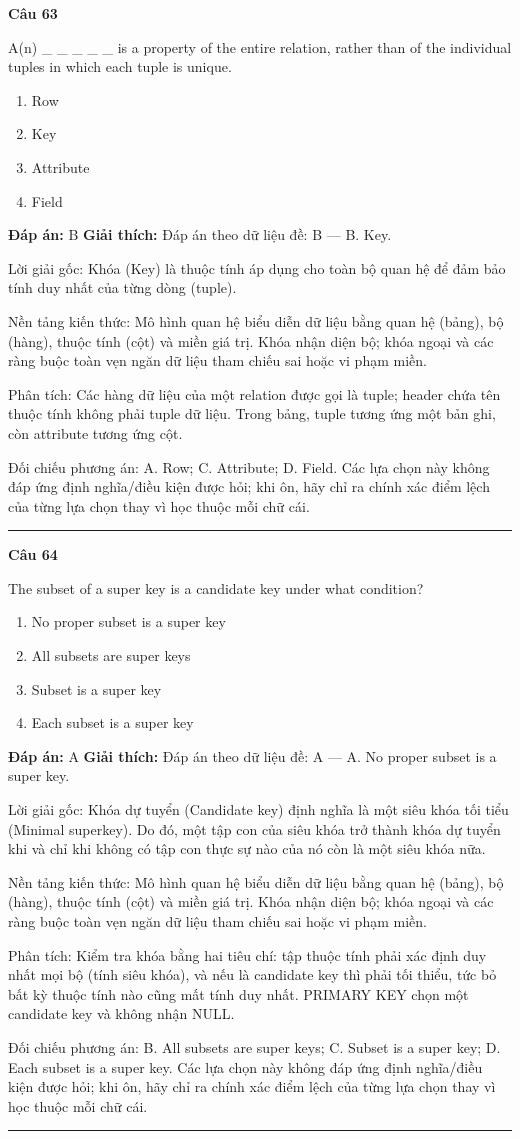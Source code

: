 \documentclass[11pt,a4paper]{article}
\newenvironment{question}[1]{%
  \par\vspace{1em}\noindent\textbf{\large Câu #1}\par\vspace{0.4em}
}{%
  \par\vspace{1em}\hrule\vspace{0.6em}
}
\newenvironment{choices}{%
  \begin{enumerate}[label=\textbf{\Alph*.},leftmargin=2.2em,itemsep=2pt,topsep=3pt]
}{%
  \end{enumerate}
}
\newcommand{\choice}{\item}
\begin{document}
\begin{question}{63}
A(n) _ _ _ _ _ is a property of the entire relation, rather than of the individual tuples in which each tuple is unique.
\begin{choices}
\choice Row
\choice Key
\choice Attribute
\choice Field
\end{choices}
\textbf{Đáp án:} B
\textbf{Giải thích:} Đáp án theo dữ liệu đề: B — B. Key.

Lời giải gốc: Khóa (Key) là thuộc tính áp dụng cho toàn bộ quan hệ để đảm bảo tính duy nhất của từng dòng (tuple).

Nền tảng kiến thức: Mô hình quan hệ biểu diễn dữ liệu bằng quan hệ (bảng), bộ (hàng), thuộc tính (cột) và miền giá trị. Khóa nhận diện bộ; khóa ngoại và các ràng buộc toàn vẹn ngăn dữ liệu tham chiếu sai hoặc vi phạm miền.

Phân tích: Các hàng dữ liệu của một relation được gọi là tuple; header chứa tên thuộc tính không phải tuple dữ liệu. Trong bảng, tuple tương ứng một bản ghi, còn attribute tương ứng cột.

Đối chiếu phương án: A. Row; C. Attribute; D. Field. Các lựa chọn này không đáp ứng định nghĩa/điều kiện được hỏi; khi ôn, hãy chỉ ra chính xác điểm lệch của từng lựa chọn thay vì học thuộc mỗi chữ cái.
\end{question}

\begin{question}{64}
The subset of a super key is a candidate key under what condition?
\begin{choices}
\choice No proper subset is a super key
\choice All subsets are super keys
\choice Subset is a super key
\choice Each subset is a super key
\end{choices}
\textbf{Đáp án:} A
\textbf{Giải thích:} Đáp án theo dữ liệu đề: A — A. No proper subset is a super key.

Lời giải gốc: Khóa dự tuyển (Candidate key) định nghĩa là một siêu khóa tối tiểu (Minimal superkey). Do đó, một tập con của siêu khóa trở thành khóa dự tuyển khi và chỉ khi không có tập con thực sự nào của nó còn là một siêu khóa nữa.

Nền tảng kiến thức: Mô hình quan hệ biểu diễn dữ liệu bằng quan hệ (bảng), bộ (hàng), thuộc tính (cột) và miền giá trị. Khóa nhận diện bộ; khóa ngoại và các ràng buộc toàn vẹn ngăn dữ liệu tham chiếu sai hoặc vi phạm miền.

Phân tích: Kiểm tra khóa bằng hai tiêu chí: tập thuộc tính phải xác định duy nhất mọi bộ (tính siêu khóa), và nếu là candidate key thì phải tối thiểu, tức bỏ bất kỳ thuộc tính nào cũng mất tính duy nhất. PRIMARY KEY chọn một candidate key và không nhận NULL.

Đối chiếu phương án: B. All subsets are super keys; C. Subset is a super key; D. Each subset is a super key. Các lựa chọn này không đáp ứng định nghĩa/điều kiện được hỏi; khi ôn, hãy chỉ ra chính xác điểm lệch của từng lựa chọn thay vì học thuộc mỗi chữ cái.
\end{question}
\end{document}
